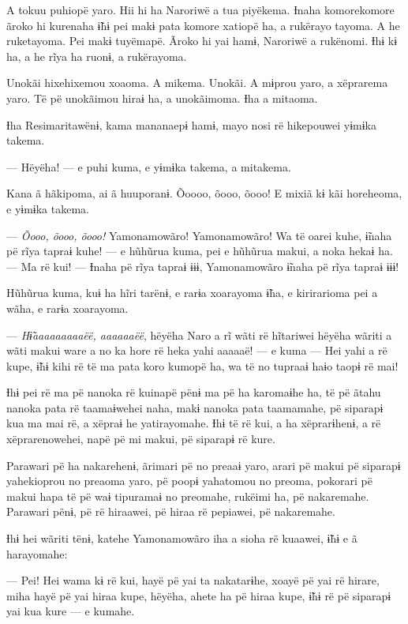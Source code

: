 A tokuu puhiopë yaro. Hii hi ha Naroriwë a tua piyëkema. Ɨnaha
komorekomore ãroko hi kurenaha ɨ̃hɨ pei makɨ pata komore xatiopë ha, a
rukërayo tayoma. A he ruketayoma. Pei makɨ tuyëmapë. Ãroko hi yai hamɨ,
Naroriwë a rukënomi. Ɨhɨ kɨ ha, a he rĩya ha ruonɨ, a rukërayoma. 

Unokãi hixehixemou xoaoma. A mikema. Unokãi. A mɨprou yaro, a xëprarema
yaro. Të pë unokãimou hiraɨ ha, a unokãimoma. Ɨha a mitaoma. 

Ɨha Resimaritawënɨ, kama mananaepɨ hamɨ, mayo nosi rë hikepouwei yɨmɨka
takema. 

--- Hëyëha! --- e puhi kuma, e yɨmɨka takema, a mitakema. 

Kana ã hãkipoma, ai ã huuporanɨ. Õoooo, õooo, õooo! E mixiã kɨ kãi
horeheoma, e yɨmɨka takema. 

--- \textit{Õooo, õooo, õooo!} Yamonamowãro! Yamonamowãro! Wa të oarei kuhe,
ɨ̃naha pë rĩya tapraɨ kuhe! --- e hũhũrua kuma, pei e hũhũrua makui, a
noka hekaɨ ha. --- Ma rë kui! --- Ɨnaha pë rĩya tapraɨ ɨɨɨ, Yamonamowãro
ɨ̃naha pë rĩya tapraɨ ɨɨɨ! 

Hũhũrua kuma, kuɨ ha hĩri tarënɨ, e rarɨa xoarayoma ɨ̃ha, e kirirarioma
pei a wãha, e rarɨa xoarayoma. 

--- \textit{Hɨ̃aaaaaaaaaëë, aaaaaaëë}, hëyëha Naro a rĩ wãti rë hĩtariwei hëyëha
wãriti a wãti makui ware a no ka hore rë heka yahi aaaaaë! --- e kuma
--- Hei yahi a rë kupe, ɨ̃hɨ kihi rë të ma pata koro kumopë ha, wa të no
tupraaɨ haɨo taopɨ rë mai! 

Ɨhɨ pei rë ma pë nanoka rë kuinapë pënɨ ma pë ha karomaɨhe ha, të pë
ãtahu nanoka pata rë taamaɨwehei naha, makɨ nanoka pata taamamahe, pë
siparapɨ kua ma mai rë, a xëpraɨ he yatirayomahe. Ɨhɨ të rë kui, a ha
xëprarɨhenɨ, a rë xëprarenowehei, napë pë mi makui, pë siparapɨ rë
kure. 

Parawari pë ha nakarehenɨ, ãrimari pë no preaaɨ yaro, arari pë makui pë
siparapɨ yahekioprou no preaoma yaro, pë poopɨ yahatomou no preoma,
pokorari pë makui hapa të pë waɨ tipuramaɨ no preomahe, rukëimi ha, pë
nakaremahe. Parawari pënɨ, pë rë hiraawei, pë hiraa rë pepiawei, pë
nakaremahe. 

Ɨhɨ hei wãriti tënɨ, katehe Yamonamowãro iha a sioha rë kuaawei, ɨ̃hɨ e ã
harayomahe: 

--- Pei! Hei wama kɨ rë kui, hayë pë yai ta nakatarɨhe, xoayë pë yai rë
hirare, miha hayë pë yai hiraa kupe, hëyëha, ahete ha pë hiraa kupe, ɨ̃hɨ
rë pë siparapɨ yai kua kure --- e kumahe. 


